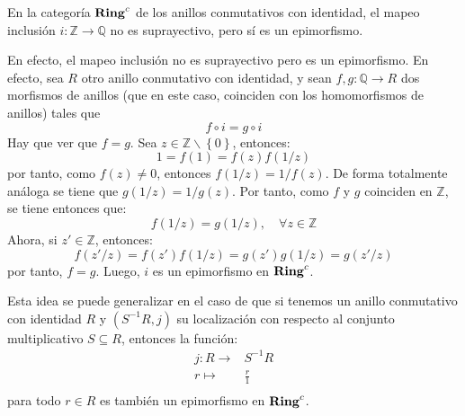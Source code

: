\documentclass[12pt]{report}
\theoremstyle{largebreak}
\newcommand\cf[3]{\ensuremath{#1:#2\rightarrow#3}}
\newcommand{\Cat}[1]{\ensuremath{\textup{\textbf{#1}}}}
\begin{document}
    \begin{exa}
        En la categoría $\Cat{Ring}^c$ de los anillos conmutativos con identidad, el mapeo inclusión $\cf{i}{\mathbb{Z}}{\mathbb{Q}}$ no es suprayectivo, pero sí es un epimorfismo.
    \end{exa}

    \begin{sol}
        En efecto, el mapeo inclusión no es suprayectivo pero es un epimorfismo. En efecto, sea $R$ otro anillo conmutativo con identidad, y sean $\cf{f,g}{\mathbb{Q}}{R}$ dos morfismos de anillos (que en este caso, coinciden con los homomorfismos de anillos) tales que
        \begin{equation*}
            f\circ i=g\circ i
        \end{equation*}
        Hay que ver que $f=g$. Sea $z\in\mathbb{Z}\backslash\left\{0\right\}$, entonces:
        \begin{equation*}
            1=f(1)=f(z)f(1/z)
        \end{equation*}
        por tanto, como $f(z)\neq 0$, entonces $f(1/z)=1/f(z)$. De forma totalmente análoga se tiene que $g(1/z)=1/g(z)$. Por tanto, como $f$ y $g$ coinciden en $\mathbb{Z}$, se tiene entonces que:
        \begin{equation*}
            f(1/z)=g(1/z),\quad\forall z\in\mathbb{Z}
        \end{equation*}
        Ahora, si $z'\in\mathbb{Z}$, entonces:
        \begin{equation*}
            f(z'/z)=f(z')f(1/z)=g(z')g(1/z)=g(z'/z)
        \end{equation*}
        por tanto, $f=g$. Luego, $i$ es un epimorfismo en $\Cat{Ring}^c$.

        Esta idea se puede generalizar en el caso de que si tenemos un anillo conmutativo con identidad $R$ y $(S^{-1}R,j)$ su localización con respecto al conjunto multiplicativo $S\subseteq R$, entonces la función:
        \begin{equation*}
            \begin{split}
                j:R\rightarrow& S^{-1}R\\
                r\mapsto &\frac{r}{1}\\
            \end{split}
        \end{equation*}
        para todo $r\in R$ es también un epimorfismo en $\Cat{Ring}^c$.
    \end{sol}
    
\end{document}
